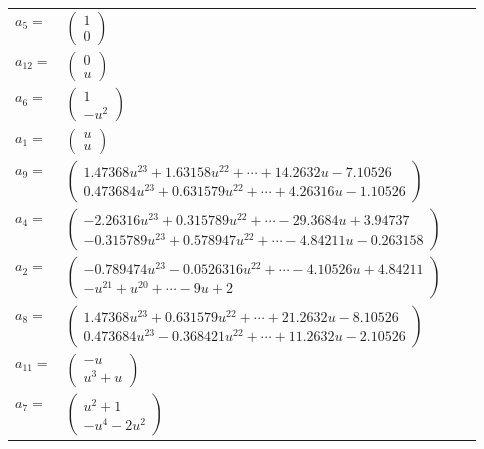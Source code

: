 \documentclass[1p]{elsarticle_modified}
\theoremstyle{definition}
\begin{document}
\begin{tabular}{m{7pt} m{180pt} m{7pt} m{180pt} }
\flushright $a_{5}=$&$\begin{pmatrix}1\\0\end{pmatrix}$ \\
\flushright $a_{12}=$&$\begin{pmatrix}0\\u\end{pmatrix}$ \\
\flushright $a_{6}=$&$\begin{pmatrix}1\\- u^2\end{pmatrix}$ \\
\flushright $a_{1}=$&$\begin{pmatrix}u\\u\end{pmatrix}$ \\
\flushright $a_{9}=$&$\begin{pmatrix}1.47368 u^{23}+1.63158 u^{22}+\cdots+14.2632 u-7.10526\\0.473684 u^{23}+0.631579 u^{22}+\cdots+4.26316 u-1.10526\end{pmatrix}$ \\
\flushright $a_{4}=$&$\begin{pmatrix}-2.26316 u^{23}+0.315789 u^{22}+\cdots-29.3684 u+3.94737\\-0.315789 u^{23}+0.578947 u^{22}+\cdots-4.84211 u-0.263158\end{pmatrix}$ \\
\flushright $a_{2}=$&$\begin{pmatrix}-0.789474 u^{23}-0.0526316 u^{22}+\cdots-4.10526 u+4.84211\\- u^{21}+u^{20}+\cdots-9 u+2\end{pmatrix}$ \\
\flushright $a_{8}=$&$\begin{pmatrix}1.47368 u^{23}+0.631579 u^{22}+\cdots+21.2632 u-8.10526\\0.473684 u^{23}-0.368421 u^{22}+\cdots+11.2632 u-2.10526\end{pmatrix}$ \\
\flushright $a_{11}=$&$\begin{pmatrix}- u\\u^3+u\end{pmatrix}$ \\
\flushright $a_{7}=$&$\begin{pmatrix}u^2+1\\- u^4-2 u^2\end{pmatrix}$ \\

\end{tabular}
\end{document}
